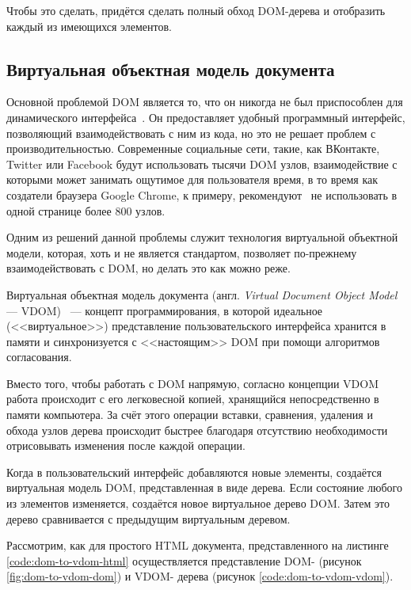 Чтобы это сделать, придётся сделать полный обход DOM-дерева и отобразить каждый из имеющихся элементов.

\subsection{Виртуальная объектная модель документа}

Основной проблемой DOM является то, что он никогда не был приспособлен для динамического интерфейса~\cite{not-dynamic}. 
Он предоставляет удобный программный интерфейс, позволяющий взаимодействовать с ним из кода, но это не решает проблем с производительностью.
Современные социальные сети, такие, как ВКонтакте, Twitter или Facebook будут использовать тысячи DOM узлов, взаимодействие с которыми может занимать ощутимое для пользователя время, в то время как создатели браузера Google Chrome, к примеру, рекомендуют~\cite{dom-max} не использовать в одной странице более 800 узлов.

Одним из решений данной проблемы служит технология виртуальной объектной модели, которая, хоть  и не является стандартом, позволяет по-прежнему взаимодействовать с DOM, но делать это как можно реже.

Виртуальная объектная модель документа (англ. \textit{Virtual Document Object Model} --- VDOM)~\cite{vdom} ---  концепт программирования, в которой идеальное (<<виртуальное>>) представление пользовательского интерфейса хранится в памяти и синхронизуется с <<настоящим>> DOM при помощи алгоритмов согласования.

Вместо того, чтобы работать с DOM напрямую, согласно концепции VDOM работа происходит с его легковесной копией, хранящийся непосредственно в памяти компьютера. 
За счёт этого операции вставки, сравнения, удаления и обхода узлов дерева происходит быстрее благодаря отсутствию необходимости отрисовывать изменения после каждой операции.

Когда в пользовательский интерфейс добавляются новые элементы, создаётся виртуальная модель DOM, представленная в виде дерева. 
Если состояние любого из элементов изменяется, создаётся новое виртуальное дерево DOM. 
Затем это дерево сравнивается с предыдущим виртуальным деревом.


Рассмотрим, как для простого  HTML документа, представленного на листинге \ref{code:dom-to-vdom-html} осуществляется представление DOM- (рисунок \ref{fig:dom-to-vdom-dom}) и VDOM- дерева (рисунок \ref{code:dom-to-vdom-vdom}).

 
